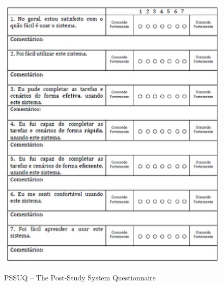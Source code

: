 \begin{figure}[!h]
    \centering
    \includegraphics[keepaspectratio=true,scale=0.60]
      {figuras/pssuq01.eps}
    \label{pssuq}
	\caption{PSSUQ – The Post-Study System Questionnaire}
\end{figure}

\newpage

